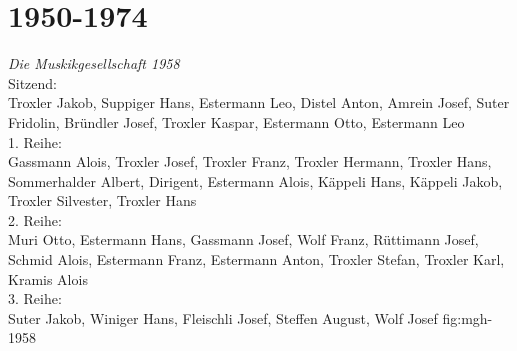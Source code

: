 \documentclass[]{book}
\begin{document}
\begin{figure}[ht]
{    }\hfil
\end{figure}

\clearpage

\section{1950-1974}

{\emph{Die Muskikgesellschaft 1958}\\
    Sitzend:\\
    Troxler Jakob, Suppiger Hans, Estermann Leo, Distel Anton, Amrein Josef,
    Suter Fridolin, Bründler Josef, Troxler Kaspar, Estermann Otto, Estermann
    Leo\\
    1. Reihe:\\
    Gassmann Alois, Troxler Josef, Troxler Franz, Troxler Hermann, Troxler Hans,
    Sommerhalder Albert, Dirigent, Estermann Alois, Käppeli Hans, Käppeli Jakob,
    Troxler Silvester, Troxler Hans\\
    2. Reihe:\\
    Muri Otto, Estermann Hans, Gassmann Josef, Wolf Franz, Rüttimann Josef,
    Schmid Alois, Estermann Franz, Estermann Anton, Troxler Stefan, Troxler
    Karl, Kramis Alois\\
    3. Reihe:\\
    Suter Jakob, Winiger Hans, Fleischli Josef, Steffen August, Wolf Josef }
{fig:mgh-1958}
\end{document}
